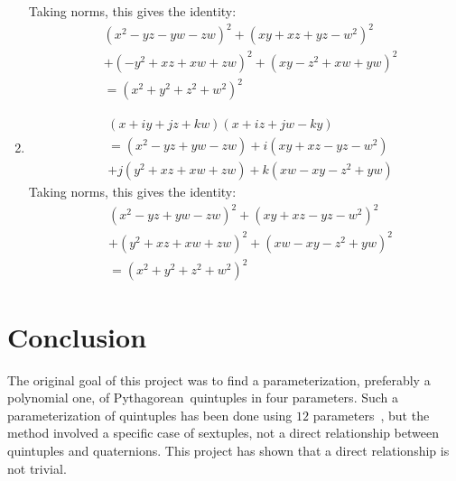 \documentclass[12pt]{article}
\theoremstyle{definition}
\numberwithin{equation}{section}
\begin{document}
\begin{enumerate}[{Identity} I:]
Taking norms, this gives the identity:
    \begin{align*}
    &(x^2 - yz - yw - zw )^2 + (xy + xz + yz - w^2)^2 \\
        &+ (-y^2 + xz + xw + zw)^2 + (xy - z^2 + xw + yw)^2 \\
    &= (x^2 + y^2 + z^2 + w^2)^2
    \end{align*}
\item
    \begin{align*}
    &(x + iy + jz + kw)(x + iz + jw - ky) \\
    &= (x^2 - yz + yw - zw ) + i(xy + xz - yz - w^2) \\
        &+ j(y^2 + xz + xw + zw) + k(xw - xy - z^2  + yw) 
    \end{align*}
Taking norms, this gives the identity:
    \begin{align*}
    &(x^2 - yz + yw - zw )^2 + (xy + xz - yz - w^2)^2 \\
        &+ (y^2 + xz + xw + zw)^2 + (xw - xy - z^2  + yw)^2 \\
    &= (x^2 + y^2 + z^2 + w^2)^2
    \end{align*}
\end{enumerate}











\section{Conclusion}



The original
goal of this project was to find a parameterization, preferably a polynomial one,  of 
Pythagorean~quintuples in four parameters.
Such a parameterization of quintuples
has been done using $12$ parameters~\cite{Polynomial_parametrization},
but the method involved a
specific case of sextuples, not a direct relationship between 
quintuples and quaternions. 
This project has shown that a
direct relationship is not trivial.
\end{document}
